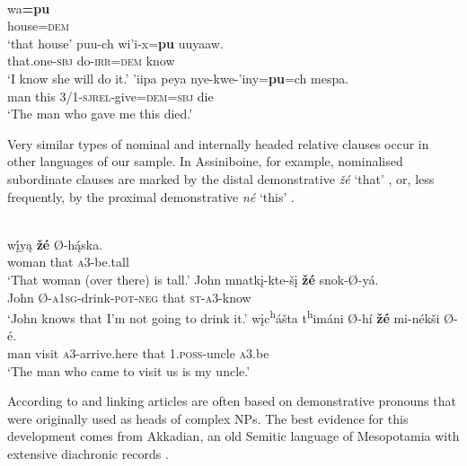 \documentclass[output=paper,colorlinks,citecolor=brown]{langscibook}
\begin{document}
\ea\label{ex:diessel:8}
\\
\ea\label{ex:diessel:8a} 
\gll   wa\textbf{=pu}\\
       house=\textsc{dem}\\
\glt   ‘that house’
\ex\label{ex:diessel:8b}
\gll   {\ob}puu-ch  wi’i-x{\cb}=\textbf{pu}  uuyaaw.\\
       {\db}that.one-\textsc{sbj}  do-\textsc{irr=dem}  know\\
\glt   ‘I know she will do it.’
\ex\label{ex:diessel:8c}
\gll   {\ob}’iipa peya nye-kwe-’iny{\cb}=\textbf{pu}=ch    mespa.\\
       {\db}man this 3/1-\textsc{sjrel}-give=\textsc{dem=sbj}   die\\
\glt   ‘The man who gave me this died.’
\z
\z

Very similar types of nominal and internally headed relative clauses occur in other languages of our sample. In Assiniboine, for example, nominalised subordinate clauses are marked by the distal demonstrative \textit{žé} ‘that’ , or, less frequently, by the proximal demonstrative \textit{né} ‘this’ \citep[415-417]{Cumberland2005}.

\ea\label{ex:diessel:9}
\\
\ea\label{ex:diessel:9a}
\gll   {\ob}wį́yą  \textbf{žé}{\cb} Ø-hą́ska.\\
       {\db}woman  that  \textsc{a3}-be.tall\\
\glt   ‘That woman (over there) is tall.’
\ex\label{ex:diessel:9b}
\gll   John  {\ob}mnatkį-kte-šį    \textbf{žé}{\cb}  snok-Ø-yá.\\
       John  {\db}\textsc{Ø-a1sg}-drink-\textsc{pot-neg}  that  \textsc{st-a3}-know\\
\glt   ‘John knows that I’m not going to drink it.’
\ex\label{ex:diessel:9c}
\gll   {\ob}wįc\textsuperscript{h}ášta t\textsuperscript{h}imáni   Ø-hí    \textbf{žé}{\cb} mi-nékši  Ø-é.\\
       {\db}man   visit  \textsc{a3}-arrive.here  that   \textsc{1.poss}-uncle  \textsc{a3}.be\\
\glt   ‘The man who came to visit us is my uncle.’
\z
\z

According to \citet{Schuh1990} and \citet{Aristar1991} linking articles are often based on demonstrative pronouns that were originally used as heads of complex NPs. The best evidence for this development comes from Akkadian, an old Semitic language of Mesopotamia with extensive diachronic records \citep{Deutscher2000,Deutscher2009}. 
\end{document}

